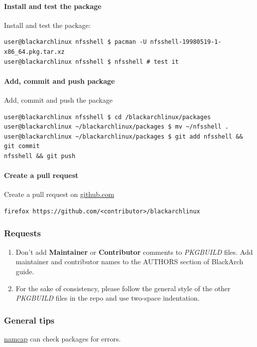 \documentclass[a4paper, twoside, 11pt]{article}
\begin{document}
\paragraph{Install and test the package}
Install and test the package:
{\small
\begin{verbatim}
user@blackarchlinux nfsshell $ pacman -U nfsshell-19980519-1-x86_64.pkg.tar.xz
user@blackarchlinux nfsshell $ nfsshell # test it
\end{verbatim}
}

\paragraph{Add, commit and push package}
Add, commit and push the package
{\small
\begin{verbatim}
user@blackarchlinux nfsshell $ cd /blackarchlinux/packages
user@blackarchlinux ~/blackarchlinux/packages $ mv ~/nfsshell .
user@blackarchlinux ~/blackarchlinux/packages $ git add nfsshell && git commit
nfsshell && git push
\end{verbatim}
}

\paragraph{Create a pull request}
Create a pull request on \href{https://github.com/}{github.com}
{\small
\begin{verbatim}
firefox https://github.com/<contributor>/blackarchlinux
\end{verbatim}
}

\subsubsection{Requests}
\begin{enumerate}
\item Don't add \textbf{Maintainer} or \textbf{Contributor} comments to
\textit{PKGBUILD} files. Add maintainer and contributor names to the
AUTHORS section of BlackArch guide.
\item For the sake of consistency, please follow the general style of the other
\textit{PKGBUILD} files in the repo and use two-space indentation.
\end{enumerate}

\subsubsection{General tips}
\href{http://wiki.archlinux.org/index.php/Namcap}{namcap} can check packages for
errors.

\appendix

\end{document}
